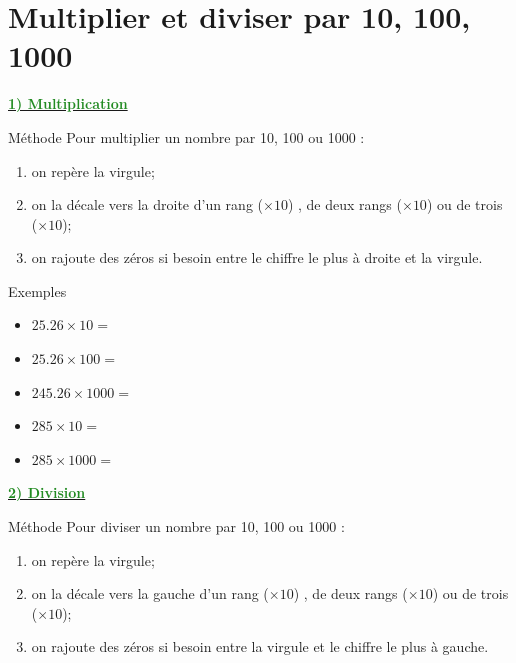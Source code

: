 \documentclass[xcolor={dvipsnames}]{beamer}
\begin{document}
\section{Multiplier et diviser par 10, 100, 1000}

\begin{frame}
	\textbf{\underline{\textcolor{ForestGreen}{1) Multiplication}}}
	
	\begin{block}{Méthode}
		Pour multiplier un nombre par 10, 100 ou 1000 :
		\begin{enumerate}
			\item on repère la virgule;
			\item on la décale vers la droite d'un rang ($\times 10$) , de deux rangs ($\times 10$) ou de trois ($\times 10$);
			\item on rajoute des zéros si besoin entre le chiffre le plus à droite et la virgule.
		\end{enumerate}
	\end{block}
\end{frame}

\begin{frame}
	\begin{exampleblock}{Exemples}
		\begin{itemize}
			\item $\num{25.26} \times 10 = $
			\item $\num{25.26} \times 100 = $
			\item $\num{245.26} \times 1000 = $
			\item $\num{285} \times 10 = $ 
			\item $\num{285} \times 1000 = $ 
		\end{itemize}
	\end{exampleblock}
\end{frame}


\begin{frame}
	\textbf{\underline{\textcolor{ForestGreen}{2) Division}}}
	
	\begin{block}{Méthode}
		Pour diviser un nombre par 10, 100 ou 1000 :
		\begin{enumerate}
			\item on repère la virgule;
			\item on la décale vers la gauche d'un rang ($\times 10$) , de deux rangs ($\times 10$) ou de trois ($\times 10$);
			\item on rajoute des zéros si besoin entre la virgule et le chiffre le plus à gauche.
		\end{enumerate}
	\end{block}
\end{frame}
\end{document}
